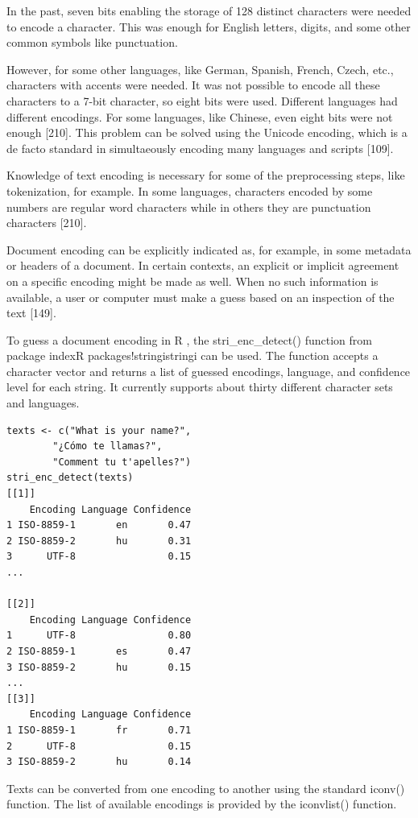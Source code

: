 \documentclass[11pt,openany,executivepaper]{book}
\begin{document}
In the past, seven bits enabling the storage of 128 distinct characters were needed to encode a character. This was enough for English letters, digits, and some other common symbols like punctuation.

However, for some other languages, like German, Spanish, French, Czech, etc., characters with accents were needed. It was not possible to encode all these characters to a 7-bit character, so eight bits were used. Different languages had different encodings. For some languages, like Chinese, even eight bits were not enough [210]. This problem can be solved using the Unicode encoding, which is a de facto standard in simultaeously encoding many languages and scripts [109].

Knowledge of text encoding is necessary for some of the preprocessing steps, like tokenization, for example. In some languages, characters encoded by some numbers are regular word characters while in others they are punctuation characters [210].

Document encoding can be explicitly indicated as, for example, in some metadata or headers of a document. In certain contexts, an explicit or implicit agreement on a specific encoding might be made as well. When no such information is available, a user or computer must make a guess based on an inspection of the text [149].

To guess a document encoding in R , the stri\_enc\_detect() function from package indexR packages!stringistringi can be used. The function accepts a character vector and returns a list of guessed encodings, language, and confidence level for each string. It currently supports about thirty different character sets and languages.

\begin{verbatim}
texts <- c("What is your name?",
        "¿Cómo te llamas?",
        "Comment tu t'apelles?")
stri_enc_detect(texts)
[[1]]
    Encoding Language Confidence
1 ISO-8859-1       en       0.47
2 ISO-8859-2       hu       0.31
3      UTF-8                0.15
...

[[2]]
    Encoding Language Confidence
1      UTF-8                0.80
2 ISO-8859-1       es       0.47
3 ISO-8859-2       hu       0.15
...
[[3]]
    Encoding Language Confidence
1 ISO-8859-1       fr       0.71
2      UTF-8                0.15
3 ISO-8859-2       hu       0.14
\end{verbatim}

Texts can be converted from one encoding to another using the standard iconv() function. The list of available encodings is provided by the iconvlist() function.
\end{document}
